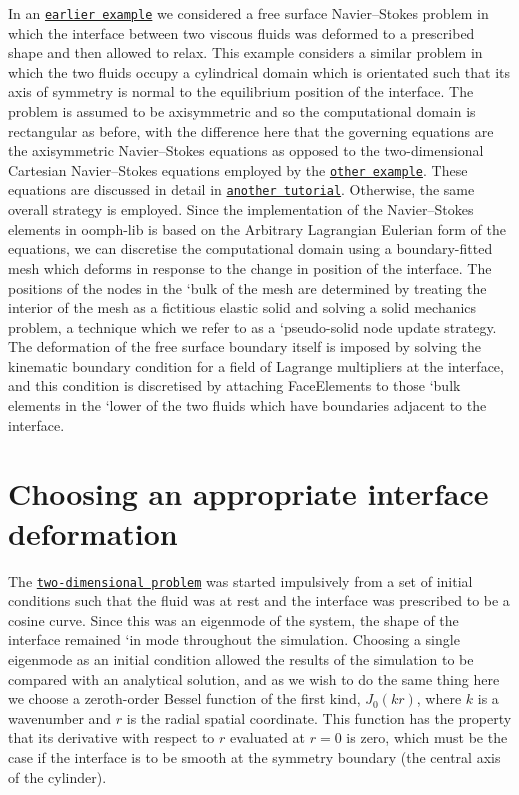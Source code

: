 In an \href{../../../navier_stokes/two_layer_interface/html/index.html}{\tt earlier example} we considered a free surface Navier--Stokes problem in which the interface between two viscous fluids was deformed to a prescribed shape and then allowed to relax. This example considers a similar problem in which the two fluids occupy a cylindrical domain which is orientated such that its axis of symmetry is normal to the equilibrium position of the interface. The problem is assumed to be axisymmetric and so the computational domain is rectangular as before, with the difference here that the governing equations are the axisymmetric Navier--Stokes equations as opposed to the two-\/dimensional Cartesian Navier--Stokes equations employed by the \href{../../../navier_stokes/two_layer_interface/html/index.html}{\tt other example}. These equations are discussed in detail in \href{../../../axisym_navier_stokes/spin_up/html/index.html}{\tt another tutorial}. Otherwise, the same overall strategy is employed. Since the implementation of the Navier--Stokes elements in {\ttfamily oomph-\/lib} is based on the Arbitrary Lagrangian Eulerian form of the equations, we can discretise the computational domain using a boundary-\/fitted mesh which deforms in response to the change in position of the interface. The positions of the nodes in the `bulk\textquotesingle{} of the mesh are determined by treating the interior of the mesh as a fictitious elastic solid and solving a solid mechanics problem, a technique which we refer to as a `pseudo-\/solid node update strategy\textquotesingle{}. The deformation of the free surface boundary itself is imposed by solving the kinematic boundary condition for a field of Lagrange multipliers at the interface, and this condition is discretised by attaching {\ttfamily Face\+Elements} to those `bulk\textquotesingle{} elements in the `lower\textquotesingle{} of the two fluids which have boundaries adjacent to the interface.\hypertarget{index_interface_def}{}\section{Choosing an appropriate interface deformation}\label{index_interface_def}
The \href{../../../navier_stokes/two_layer_interface/html/index.html}{\tt two-\/dimensional problem} was started impulsively from a set of initial conditions such that the fluid was at rest and the interface was prescribed to be a cosine curve. Since this was an eigenmode of the system, the shape of the interface remained `in mode\textquotesingle{} throughout the simulation. Choosing a single eigenmode as an initial condition allowed the results of the simulation to be compared with an analytical solution, and as we wish to do the same thing here we choose a zeroth-\/order Bessel function of the first kind, $ J_0(kr) $, where $ k $ is a wavenumber and $ r $ is the radial spatial coordinate. This function has the property that its derivative with respect to $ r $ evaluated at $ r=0 $ is zero, which must be the case if the interface is to be smooth at the symmetry boundary (the central axis of the cylinder).

